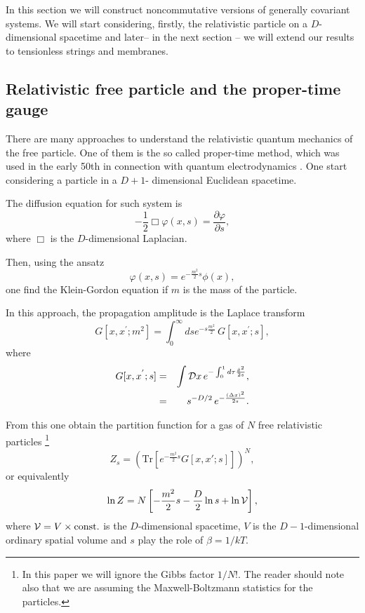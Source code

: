 \documentclass[a4paper,aps,twocolumn,amsfonts]{revtex4}
\begin{document}
   In this section we will construct noncommutative versions of generally covariant systems. We will start considering, firstly, the relativistic particle on a $D$-dimensional spacetime and later-- in the next section -- we will extend our results to tensionless strings and membranes.

   \subsection{Relativistic free particle and the proper-time gauge}

   There are many approaches to understand the relativistic quantum mechanics of the free particle. One of them is the so called proper-time method, which was used   in the early 50th in connection with quantum electrodynamics \cite{nambu}. One start considering a particle in a $D+1$- dimensional Euclidean  spacetime.

   The diffusion equation for such system is
   \begin{equation}
   -\frac{1}{2} \Box \varphi (x, s) =  \frac{\partial \varphi}{\partial s},
   \label{6}
   \end{equation}
   where $\Box$ is the $D$-dimensional Laplacian.

   Then, using the ansatz
   \begin{equation}
   \varphi (x,s) = e^{-\frac{m^2}{2} s} \phi (x), \label{7}
   \end{equation}
one find the Klein-Gordon equation if $m$ is the mass of the particle.

In this approach, the propagation amplitude is  the Laplace transform
   \begin{equation}
   G[x,x^{'}; m^2] = \int_0^\infty d s e^{-s\frac{m^2}{2} } \, G[x,x^{'}; s],
   \label{8}
   \end{equation}
   where
   \begin{eqnarray}
   G[x,x^{'}; s] &=& \int {\cal D} x \, e^{- \int_0^1 d \tau \frac{{\dot
   x}^2}{2 s}}, \label{9} \nonumber
   \\
   &=& s^{-D/2} \, e^{- \frac{(\Delta x)^2}{2 s}}.\label{99}
   \end{eqnarray}

   From this one obtain the partition function for a gas of $N$ free relativistic particles \footnote{In this paper we will ignore  the Gibbs factor $1/N!$. The reader should note also that we are assuming the Maxwell-Boltzmann statistics for the particles.}
   \begin{equation}
   Z_s=\left(\mbox{Tr}\left[e^{-\frac{m^2}{2} s} G[x,x';s]\right]\right)^N, 
   \end{equation}
   or equivalently 
   \begin{equation}
   \ln Z = N \left[ - \frac{m^2}{2} s- \frac{D}{2} \ln s   + \ln {\cal V} \right],
   \label{10}
   \end{equation}
   where ${\cal V}=V \times \mbox{const.}$ is the $D$-dimensional spacetime, $V$ is the $D-1$-dimensional ordinary spatial volume and $s$ play the role of $\beta =1/kT$.
\end{document}
